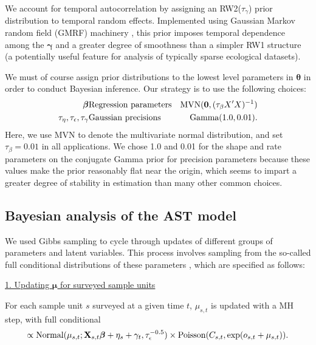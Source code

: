 \documentclass[12pt,fleqn]{article}
\begin{document}
\begin{flushleft}
\hspace{.5in} We account for temporal autocorrelation by assigning an RW2($\tau_\gamma$) prior distribution \citep[see e.g.,][section 3.4]{RueHeld2005} to temporal random effects.  Implemented using Gaussian Markov random field (GMRF) machinery \citep[again see][for a thorough treatment]{RueHeld2005}, this prior imposes temporal dependence among the $\boldsymbol{\gamma}$  and a greater degree of smoothness than a simpler RW1 structure (a potentially useful feature for analysis of typically sparse ecological datasets).

\hspace{.5in} We must of course assign prior distributions to the lowest level parameters in $\boldsymbol{\theta}$ in order to conduct Bayesian inference.  Our strategy is to use the following choices:
\begin{eqnarray*}
  \boldsymbol{\beta} & \textrm{Regression parameters} & {\rm MVN}({\bf 0},(\tau_\beta X^\prime X)^{-1}) \\
  \tau_\eta,\tau_\epsilon,\tau_\gamma & \textrm{Gaussian precisions} & \textrm{Gamma}(1.0,0.01).
  \label{eq:priors}
\end{eqnarray*}
Here, we use MVN to denote the multivariate normal distribution, and set $\tau_\beta=0.01$ in all applications.  We chose 1.0 and 0.01 for the shape and rate parameters on the conjugate Gamma prior for precision parameters because these values make the prior reasonably flat near the origin, which seems to impart a greater degree of stability in estimation than many other common choices.

\subsection{Bayesian analysis of the AST model}

We used Gibbs sampling to cycle through updates of different groups of parameters and latent variables.  This process involves sampling from the so-called full conditional distributions of these parameters \citep{GelmanEtAl2004}, which are specified as follows:

\underline{1. Updating $\boldsymbol{\mu}$ for surveyed sample units}

For each sample unit $s$ surveyed at a given time $t$, $\mu_{s,t}$ is updated with a MH step, with
full conditional
\begin{equation*}
  [\mu_{s,t} | \cdot] \propto \textrm{Normal}(\mu_{s,t};{\bf X}_{s,t} \boldsymbol{\beta} + \eta_s + \gamma_t,\tau_\epsilon^{-0.5}) \times \textrm{Poisson}(C_{s,t},\exp(o_{s,t}+\mu_{s,t})).
\end{equation*}


\end{flushleft}
\end{document}

